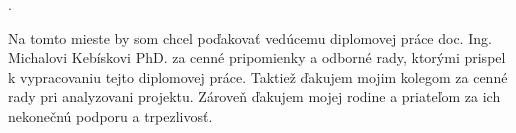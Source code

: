 \newpage
\phantom.
\vspace{12cm}
\vspace{2em}
\bigskip
\noindent

Na tomto mieste by som chcel poďakovať vedúcemu diplomovej práce doc. Ing. Michalovi Kebískovi PhD.  za cenné pripomienky a odborné rady, ktorými prispel k vypracovaniu tejto diplomovej práce. Taktiež ďakujem mojim kolegom za cenné rady pri analyzovani projektu. Zároveň ďakujem mojej rodine a priateľom za ich nekonečnú podporu a trpezlivosť. 

\vspace{2em}